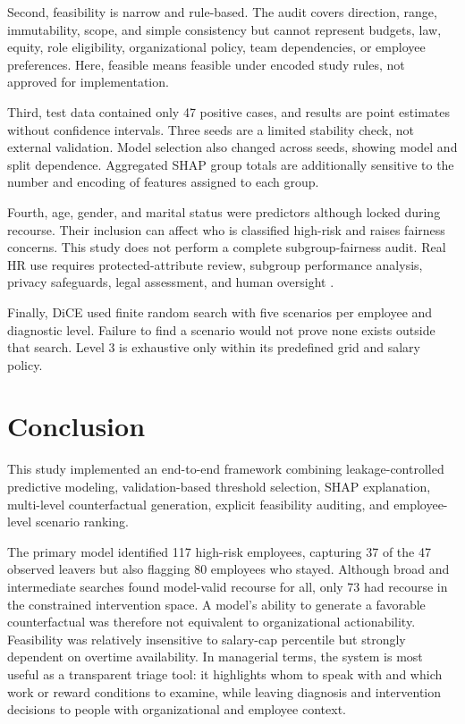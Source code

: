 \documentclass[11pt]{article}
\begin{document}
Second, feasibility is narrow and rule-based. The audit covers direction, range, immutability, scope, and simple consistency but cannot represent budgets, law, equity, role eligibility, organizational policy, team dependencies, or employee preferences. Here, feasible means feasible under encoded study rules, not approved for implementation.

Third, test data contained only 47 positive cases, and results are point estimates without confidence intervals. Three seeds are a limited stability check, not external validation. Model selection also changed across seeds, showing model and split dependence. Aggregated SHAP group totals are additionally sensitive to the number and encoding of features assigned to each group.

Fourth, age, gender, and marital status were predictors although locked during recourse. Their inclusion can affect who is classified high-risk and raises fairness concerns. This study does not perform a complete subgroup-fairness audit. Real HR use requires protected-attribute review, subgroup performance analysis, privacy safeguards, legal assessment, and human oversight \cite{kochling2020,tambe2019}.

Finally, DiCE used finite random search with five scenarios per employee and diagnostic level. Failure to find a scenario would not prove none exists outside that search. Level 3 is exhaustive only within its predefined grid and salary policy.

\section{Conclusion}
This study implemented an end-to-end framework combining leakage-controlled predictive modeling, validation-based threshold selection, SHAP explanation, multi-level counterfactual generation, explicit feasibility auditing, and employee-level scenario ranking.

The primary model identified 117 high-risk employees, capturing 37 of the 47 observed leavers but also flagging 80 employees who stayed. Although broad and intermediate searches found model-valid recourse for all, only 73 had recourse in the constrained intervention space. A model's ability to generate a favorable counterfactual was therefore not equivalent to organizational actionability. Feasibility was relatively insensitive to salary-cap percentile but strongly dependent on overtime availability. In managerial terms, the system is most useful as a transparent triage tool: it highlights whom to speak with and which work or reward conditions to examine, while leaving diagnosis and intervention decisions to people with organizational and employee context.
\end{document}
